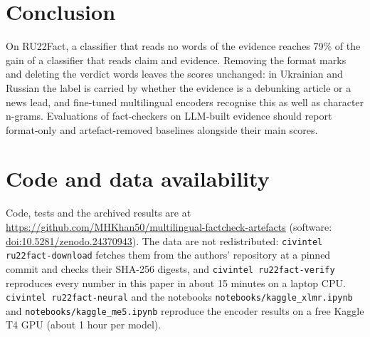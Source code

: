 \documentclass[11pt,a4paper]{article}
\newcommand{\code}[1]{\texttt{#1}}
\begin{document}
\section{Conclusion}

On RU22Fact, a classifier that reads no words of the evidence reaches 79\% of the gain of a classifier that reads
claim and evidence. Removing the format marks and deleting the verdict words leaves the scores unchanged: in
Ukrainian and Russian the label is carried by whether the evidence is a debunking article or a news lead, and
fine-tuned multilingual encoders recognise this as well as character n-grams. Evaluations of fact-checkers on LLM-built evidence should report format-only and artefact-removed
baselines alongside their main scores.

\section*{Code and data availability}

Code, tests and the archived results are at \url{https://github.com/MHKhan50/multilingual-factcheck-artefacts} (software:
\href{https://doi.org/10.5281/zenodo.24370943}{doi:10.5281/zenodo.24370943}). The data are not redistributed:
\code{civintel ru22fact-download} fetches them from the authors' repository at a pinned commit and checks their
SHA-256 digests, and \code{civintel ru22fact-verify} reproduces every number in this paper in about 15 minutes on a
laptop CPU. \code{civintel ru22fact-neural} and the notebooks \code{notebooks/kaggle\_xlmr.ipynb} and
\code{notebooks/kaggle\_me5.ipynb} reproduce the encoder results on a free Kaggle T4 GPU (about 1 hour per model).



\end{document}
